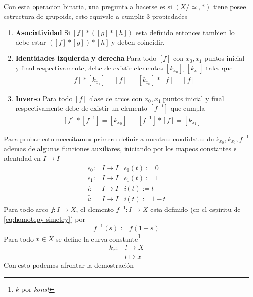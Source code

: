 Con esta operacion binaria, una pregunta a hacerse es si \((X/\simeq ,
*)\) tiene posee estructura de grupoide, esto equivale a cumplir 3
propiedades
\begin{enumerate}
\item \textbf{Asociatividad} Si \([f] * ([g] * [h])\) esta definido entonces
  tambien lo debe estar \(([f] * [g]) * [h]\) y deben coincidir.
\item \textbf{Identidades izquierda y derecha} Para todo \([f]\) con
  \(x_0, x_1\) puntos inicial y final respectivamente, debe de
existir elementos \([k_{x_0}], [k_{x_1}]\) tales que
\[ \begin{matrix}
    [f] * [k_{x_1}] = [f] & & [k_{x_0}] * [f] = [f]
  \end{matrix}
\]
\item \textbf{Inverso} Para todo \([f]\) clase de arcos con \(x_0, x_1\)
  puntos inicial y final respectivamente debe de existir un elemento
  \([f^{-1}]\) que cumpla
\[ \begin{matrix}
    [f] * [f^{-1}] = [k_{x_0}] & & [f^{-1}] * [f] = [k_{x_1}]
  \end{matrix}
\]
\end{enumerate}
Para probar esto necesitamos primero definir a nuestros candidatos de
\(k_{x_0}, k_{x_1}, f^{-1}\) ademas de algunas funciones auxiliares,
iniciando por los mapeos constantes e identidad en \(I \to I\)
\[ \begin{matrix}
     e_0 : & I \to I & e_0(t) := 0 \\
     e_1 : & I \to I & e_1(t) := 1 \\
     i :   & I \to I & i(t) := t \\
     \bar{i} : & I \to I & i(t) := 1 - t
   \end{matrix}
   \]
Para todo arco \(f : I \to X \), el elemento \(f^{-1} : I \to X \) esta
definido (en el espiritu de \eqref{eq:homotopy-simetry}) por
\[ f^{-1} (s) := f (1 - s) \]
Para todo \(x \in X \) se define la curva constante\footnote{\(k\) por
\emph{konst}}
\begin{align*}
  k_x : &I \to X \\
        &t \mapsto x
\end{align*}
Con esto podemos afrontar la demostración
